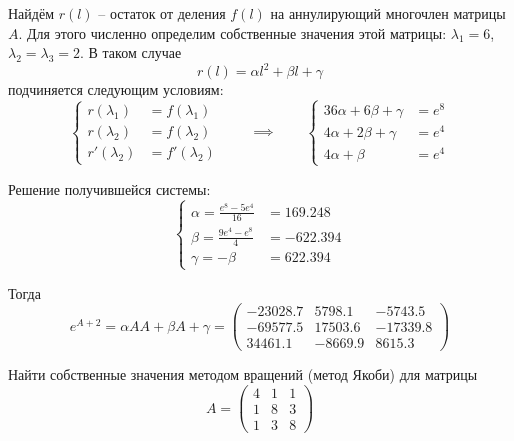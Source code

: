 Найдём $r(l)$ -- остаток от деления $f(l)$ на аннулирующий многочлен матрицы
$A$. Для этого численно определим собственные значения этой матрицы:
$\lambda_1 = 6$, $\lambda_2 = \lambda_3 = 2$. В таком случае
\begin{equation*}
    r(l) = \alpha l^2 + \beta l + \gamma
\end{equation*}
подчиняется следующим условиям:
\begin{equation*}
    \begin{cases}
        r(\lambda_1) &= f(\lambda_1)\\
        r(\lambda_2) &= f(\lambda_2)\\
        r'(\lambda_2) &= f'(\lambda_2)
    \end{cases}
    \qquad \implies \qquad
    \begin{cases}
        36 \alpha + 6\beta + \gamma &= e^8\\
        4 \alpha + 2\beta + \gamma &= e^4\\
        4 \alpha + \beta &= e^4
    \end{cases}
\end{equation*}

Решение получившейся системы:
\begin{equation*}
    \begin{cases}
        \alpha = \frac{e^8 - 5e^4}{16} &= 169.248\\
        \beta = \frac{9e^4 - e^8}{4} &= -622.394\\
        \gamma = -\beta &= 622.394
    \end{cases}
\end{equation*}

Тогда
\begin{equation*}
    e^{A+2} = \alpha AA + \beta A + \gamma =
    \begin{pmatrix}
        -23028.7 & 5798.1 & -5743.5\\
        -69577.5 & 17503.6 & -17339.8\\
        34461.1 & -8669.9 & 8615.3
    \end{pmatrix}
\end{equation*}


\vspace{1em}
\begin{problem}
    Найти собственные значения методом вращений (метод Якоби) для матрицы
    \begin{equation*}
        A = \begin{pmatrix}
            4 & 1 & 1\\
            1 & 8 & 3\\
            1 & 3 & 8
        \end{pmatrix}
    \end{equation*}
\end{problem}


